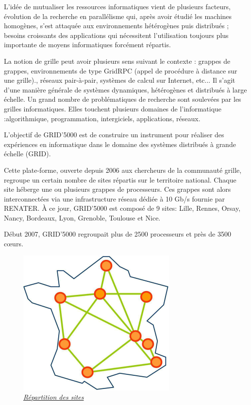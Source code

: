 L’idée de mutualiser les ressources
informatiques vient de plusieurs facteurs, évolution de la
recherche en parallélisme qui, après avoir étudié les
machines homogènes, s’est attaquée aux environnements
hétérogènes puis distribués ; besoins croissants des
applications qui nécessitent l’utilisation toujours plus
importante de moyens informatiques forcément répartis.

La notion de grille peut avoir plusieurs sens suivant le
contexte : grappes de grappes, environnements de type
GridRPC (appel de procédure à distance sur une grille).,
réseaux pair-à-pair, systèmes de calcul sur Internet, etc...
Il s’agit d’une manière générale de systèmes dynamiques,
hétérogènes et distribués à large échelle. Un grand
nombre de problématiques de recherche sont soulevées
par les grilles informatiques. Elles touchent plusieurs
domaines de l’informatique :algorithmique,
programmation, intergiciels, applications, réseaux.

L’objectif de GRID’5000 est de construire un instrument
pour réaliser des expériences en informatique dans le
domaine des systèmes distribués à grande échelle (GRID).

Cette plate-forme, ouverte depuis 2006 aux chercheurs de
la communauté grille, regroupe un certain nombre de sites
répartis sur le territoire national. Chaque site héberge une
ou plusieurs grappes de processeurs. Ces grappes sont
alors interconnectées via une infrastructure réseau dédiée
à 10 Gb/s fournie par RENATER. À ce jour, GRID’5000
est composé de 9 sites: Lille, Rennes, Orsay, Nancy,
Bordeaux, Lyon, Grenoble, Toulouse et Nice.

Début 2007, GRID’5000 regroupait plus de 2500 processeurs et près
de 3500 cœurs.

\newpage
\begin{figure}
\begin{center}
\includegraphics{images/g5k.png}
\\
\underline{\textit{Répartition des sites}}
\end{center}
\end{figure}



